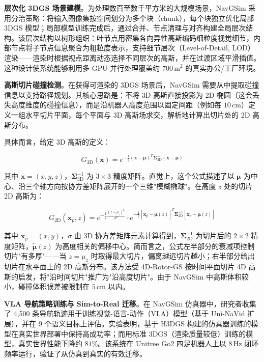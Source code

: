 \textbf{层次化 3DGS 场景建模}。为处理数百至数千平方米的大规模场景，NavGSim 采用分治策略：将输入图像集按空间划分为多个块（chunk），每个块独立优化局部 3DGS 模型；局部模型训练完成后，通过合并、节点清理与对齐构建全局层次结构。该层次结构以树形组织：叶节点用密集各向异性高斯编码细粒度视觉细节，内部节点将子节点信息聚合为粗粒度表示，支持细节层次（Level-of-Detail, LOD）渲染——渲染时根据视点距离动态选择不同层次的高斯，并在过渡区域平滑插值。这种设计使系统能够利用多 GPU 并行处理覆盖约 $700\,\text{m}^2$ 的真实办公/工厂环境。

\textbf{高斯切片碰撞检测}。在获得可渲染的 3DGS 场景后，NavGSim 需要从中提取碰撞信息以支持路径规划。其核心思路是：不将 3D 高斯直接投影为 2D 椭圆（这会丢失高度维度的碰撞信息），而是沿机器人高度范围以固定间距（例如每 $10\,\text{cm}$）定义一组水平切片平面，每个平面与 3D 高斯场求交，解析地计算出切片处的 2D 高斯分布。

具体而言，给定 3D 高斯的定义：

\begin{equation}
G_{\text{3D}}(\mathbf{x}) = e^{-\frac{1}{2}(\mathbf{x}-\boldsymbol{\mu})^T \boldsymbol{\Sigma}_{\text{3D}}^{-1} (\mathbf{x}-\boldsymbol{\mu})}
\end{equation}

其中 $\mathbf{x}=(x,y,z)$，$\boldsymbol{\Sigma}_{\text{3D}}^{-1}$ 为 $3\times3$ 精度矩阵。直觉上，这个公式描述了以 $\boldsymbol{\mu}$ 为中心、沿三个轴方向按协方差矩阵展开的一个三维"模糊椭球"。在高度 $z$ 处的切片 2D 高斯为：

\begin{equation}
G_{\text{2D}}(\mathbf{x}_p, z) = e^{-\frac{1}{2}\frac{(z-\mu_z)^2}{\sigma^2}} \cdot e^{-\frac{1}{2}[\mathbf{x}_p - \tilde{\boldsymbol{\mu}}(z)]^T \boldsymbol{\Sigma}_{\text{2D}}^{-1} [\mathbf{x}_p - \tilde{\boldsymbol{\mu}}(z)]}
\end{equation}

其中 $\mathbf{x}_p=(x,y)$，$\sigma$ 由 3D 协方差矩阵元素计算得到，$\boldsymbol{\Sigma}_{\text{2D}}^{-1}$ 为切片后的 $2\times2$ 精度矩阵，$\tilde{\boldsymbol{\mu}}(z)$ 为高度相关的偏移中心。简而言之，公式左半部分的衰减项控制切片"有多厚"——当 $z=\mu_z$ 时取得最大切片，偏离越远切片越小；右半部分给出切片在水平面上的 2D 高斯分布。该方法受 4D-Rotor-GS 按时间平面切片 4D 高斯的启发，将"沿时间切片"推广为"沿高度切片"。由于 NavGSim 中高斯体积较小，碰撞体积误差被限制在 $5\,\text{cm}$ 以内。

\textbf{VLA 导航策略训练与 Sim-to-Real 迁移}。在 NavGSim 仿真器中，研究者收集了 4,500 条导航轨迹用于训练视觉-语言-动作（VLA）模型（基于 Uni-NaVid 扩展），并在 9 个语义目标上评估。实验表明，基于 H3DGS 构建的仿真器训练的模型在真实世界部署中保持高成功率；而用标准 3DGS（渲染质量较低）训练的模型，真实世界性能下降约 $81\%$。该系统在 Unitree Go2 四足机器人上以 $8\,\text{Hz}$ 闭环频率运行，验证了从仿真到真实的有效迁移。

